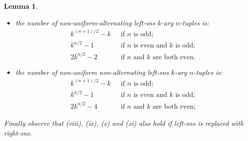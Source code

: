 \documentclass[a4paper,11pt]{article}
\theoremstyle{plain}
\newtheorem{lemma}{Lemma}[section]
\theoremstyle{definition}
\theoremstyle{remark}
\begin{document}
\begin{lemma}
\begin{itemize}
\begin{align*}
\end{align*}
\item[x)] the number of non-uniform-alternating left-sns $k$-ary $n$-tuples is:
\begin{align*}
k^{(n+1)/2}-k & \mbox{~~if $n$ is odd;} \\
k^{n/2}-1 & \mbox{~~if $n$ is even and $k$ is odd;} \\
2k^{n/2}-2 & \mbox{~~if $n$ and $k$ are both even.}
\end{align*}
\item[xi)] the number of non-uniform non-alternating left-sns $k$-ary $n$-tuples is:
\begin{align*}
k^{(n+1)/2}-k & \mbox{~~if $n$ is odd;} \\
k^{n/2}-1 & \mbox{~~if $n$ is even and $k$ is odd;} \\
2k^{n/2}-4 & \mbox{~~if $n$ and $k$ are both even;}
\end{align*}
\end{itemize}
Finally observe that (viii), (ix), (x) and (xi) also hold if left-sns is replaced with right-sns.
\end{lemma}
\end{document}
